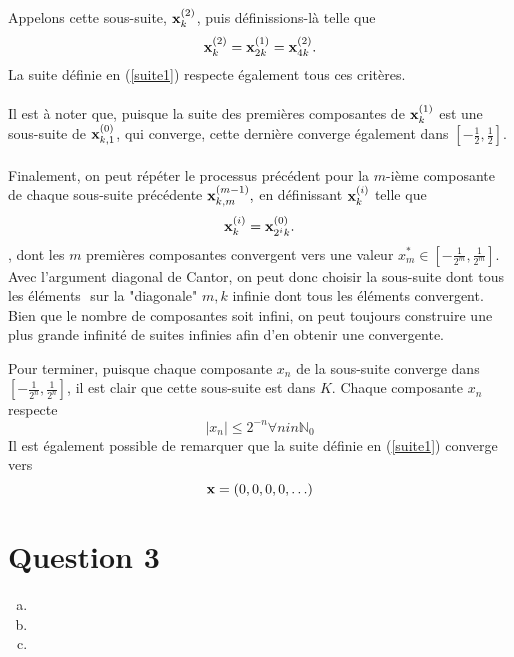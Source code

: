 \documentclass[letterpaper,12pt,oneside,final]{book}
\begin{document}
Appelons cette sous-suite, \( \vb{x}_{k}^{(2)} \), puis définissions-là telle que 
\[
    \vb{x}_{k}^{(2)} = \vb{x}_{2k}^{(1)} = \vb{x}_{4k}^{(2)}.
\]
La suite définie en (\ref{suite1}) respecte également tous ces critères.\\\\
Il est à noter que, puisque la suite des premières composantes de \( \vb{x}_{k}^{(1)} \) est une 
sous-suite de \( \vb{x}_{k,1}^{(0)} \), qui converge, cette dernière converge également dans $[-\frac{1}{2},\frac{1}{2}]$.
\\\\
Finalement, on peut répéter le processus précédent pour la $m$-ième composante de chaque sous-suite précédente
\(
\vb{x}_{k,m}^{(m-1)},
\) en définissant \( \vb{x}_{k}^{(i)} \) telle que 
\[
\vb{x}_{k}^{(i)} = \vb{x}_{2^{i}k}^{(0)}. 
\]
, dont les $m$ premières composantes convergent vers une valeur \( x_{m}^{*} \in [-\frac{1}{2^{m}}, \frac{1}{2^{m}}] \). \\ 

Avec l'argument diagonal de Cantor, on peut donc choisir la sous-suite dont tous les éléments \(  \)
sur la "diagonale" \( m,k \) infinie dont tous les éléments convergent. Bien que le nombre de composantes soit infini,
on peut toujours construire une plus grande infinité de suites infinies afin d'en obtenir une convergente.

Pour terminer, puisque chaque composante $x_n$ de la sous-suite converge dans \( [-\frac{1}{2^{n}},\frac{1}{2^{n}}] \),
il est clair que cette sous-suite est dans \( K \). Chaque composante $x_n$ respecte 
\[
\lvert x_n \rvert \leq 2^{-n} \forall n in \mathbb{N}_{0}
\]
Il est également possible de remarquer que la suite définie en (\ref{suite1}) converge vers
\[
\vb{x} = (0,0,0,0,\ldots)
\]




\newpage
\section*{Question 3}


\begin{enumerate}[a)]

\item %


\item %


\item %


\end{enumerate}
\end{document}
